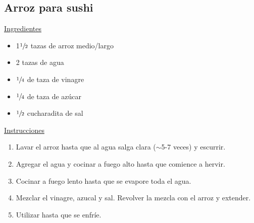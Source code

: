 \subsection{Arroz para sushi}

\underline{Ingredientes}
\begin{itemize}
\item 1$\sfrac{1}{2}$ tazas de arroz medio/largo
\item 2 tazas de agua
\item $\sfrac{1}{4}$ de taza de vinagre
\item $\sfrac{1}{4}$ de taza de az\'ucar
\item $\sfrac{1}{2}$  cucharadita de sal
\end{itemize}

\underline{Instrucciones}

\begin{enumerate}
\item Lavar el arroz hasta que al agua salga clara ($\sim$5-7 veces) y escurrir.
\item Agregar el agua y cocinar a fuego alto hasta que comience a hervir.
\item Cocinar a fuego lento hasta que se evapore toda el agua.
\item Mezclar el vinagre, azucal y sal. Revolver la mezcla con el arroz y extender.
\item Utilizar hasta que se enfr\'ie.
\end{enumerate}
